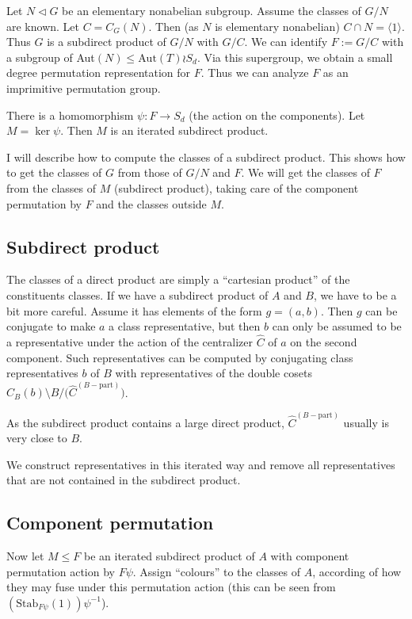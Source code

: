 \documentclass[11pt]{amsart}
\begin{document}
Let $N\lhd G$ be an elementary nonabelian subgroup. Assume the classes of
$G/N$ are known. Let $C=C_G(N)$. Then (as $N$ is elementary nonabelian)
$C\cap N=\langle 1\rangle$. Thus $G$ is a subdirect product of $G/N$
with $G/C$. We can identify $F:=G/C$ with a subgroup of 
Aut$(N)\le \mbox{Aut}(T)\wr S_d$. Via this supergroup, we obtain a small
degree permutation representation for $F$. Thus we can analyze $F$ as
an imprimitive permutation group.

There is a homomorphism $\psi\colon F\to S_d$ (the action on the
components). Let $M=\ker\psi$. Then $M$ is an iterated subdirect product.

I will describe how to compute the classes of a subdirect product. This
shows how to get the classes of $G$ from those of $G/N$ and $F$. We will get
the classes of $F$ from the classes of $M$ (subdirect product), taking care
of the component permutation by $F$ and the classes outside $M$.

\subsection{Subdirect product}
The classes of a direct product are simply a ``cartesian product'' of the
constituents classes. If we have a subdirect product of $A$ and $B$, we have
to be a bit
more careful. Assume it has elements of the form $g=(a,b)$. Then $g$ can be
conjugate to make $a$ a class representative, but then $b$ can only be
assumed to be a
representative under the action of the centralizer $\hat C$ of $a$ on the
second component. Such representatives can be computed by conjugating class
representatives $b$ of $B$ with representatives of the double cosets
${C_B(b)}{\setminus}{B}{/}{(\hat C}^{(B-\mbox{part})})$.

As the subdirect product contains a large direct product,
$\hat C^{(B-\mbox{part})}$ usually is very close to $B$.

We construct representatives in this iterated way and remove all
representatives that are not contained in the subdirect product.

\subsection{Component permutation}
Now let $M\le F$ be an iterated subdirect product of $A$ with component
permutation action by $F\psi$. Assign ``colours'' to the classes of $A$,
according of how
they may fuse under this permutation action (this can be seen from
$(\mbox{Stab}_{F\psi}(1))\psi^{-1}$).
\end{document}

